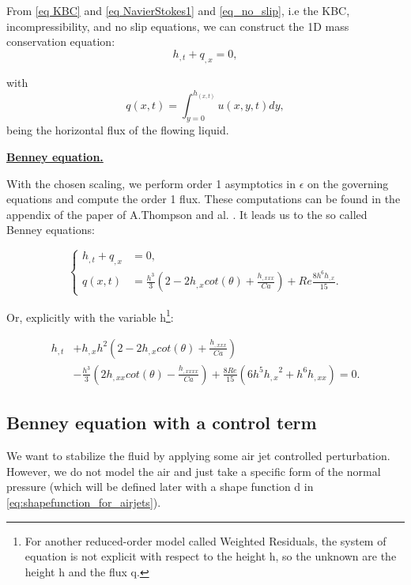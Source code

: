 \documentclass[12pt]{article}
\begin{document}
From \eqref{eq KBC} and \eqref{eq NavierStokes1} and  \eqref{eq_no_slip}, i.e the KBC, incompressibility, and no slip equations, we can construct the 1D mass conservation equation: 
\begin{equation}\label{eq mass conservation}
    h_{,t} + q_{,x} = 0,
\end{equation}

with 
\begin{equation}\label{eq:Benney_flux}
    q(x, t) = \int_{y=0}^{h_(x, t)} u(x, y, t)dy,
\end{equation}
being the horizontal flux of the flowing liquid.

\vspace{0.5cm}
\underline{\textbf{Benney equation.}}

With the chosen scaling, we perform order 1 asymptotics in $\epsilon$ on the governing equations and compute the order 1 flux.
 These computations can be found in the appendix of the paper of A.Thompson and al. \cite{A_Thompson_FLF_blowing_suction}. 
 It leads us to the so called Benney equations: 

\begin{equation}
    \boxed{
    \left\{
\begin{aligned}
    h_{,t}+q_{,x} &= 0,\\
    q(x, t) &= \frac{h^3}{3}(2-2h_{,x}cot(\theta) + \frac{h_{,xxx}}{Ca})+Re\frac{8h^6h_{,x}}{15}.
\end{aligned}
    \right.
}
\end{equation}

Or, explicitly with the variable h\footnote{For another reduced-order model called Weighted Residuals, 
the system of equation is not explicit with respect to the height h, so the unknown are the height h and the flux q.}: 

\begin{equation}\label{Benney_eq}
\boxed{
\begin{aligned}
    h_{,t} &+ h_{,x}h^2 \left( 2-2h_{,x}cot(\theta) + \frac{h_{,xxx}}{Ca}\right) \\ &- \frac{h^3}{3}\left( 2h_{,xx}cot(\theta) - \frac{h_{,xxxx}}{Ca} \right) + \frac{8Re}{15} \left( 6h^5 {h_{,x}}^2 + h^6 h_{,xx} \right) = 0.
\end{aligned}    
}
\end{equation}




\subsection{Benney equation with a control term}
We want to stabilize the fluid by applying some air jet controlled perturbation. However, we do not model the air and just take a specific form of the normal pressure (which will be defined later with 
a shape function d in \eqref{eq:shapefunction_for_airjets}). 
\\
\end{document}
